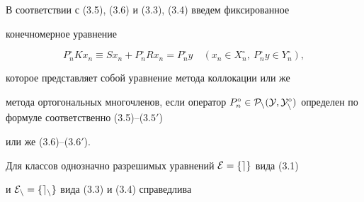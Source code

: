 В соответствии с (3.5), (3.6) и (3.3), (3.4) введем фиксированное


конечномерное уравнение


\begin{equation}


P_n^\circ Kx_n\equiv Sx_n+P_n^\circ Rx_n=P_n^\circ y\quad


(x_n\in X_n^\circ ,\ P_n^\circ y\in Y_n^\circ ),


\end{equation}


которое представляет собой уравнение метода коллокации или же


метода ортогональных многочленов, если оператор $P_n^\circ\in


\cal P_n(Y,Y_n^\circ)$ определен по формуле соответственно (3.5)--($3.5'$)


или же (3.6)--($3.6'$).





Для классов однозначно разрешимых уравнений $\cal E=\{ e\}$ вида (3.1)


и $\cal E_n=\{ e_n\} $ вида (3.3) и (3.4) справедлива





